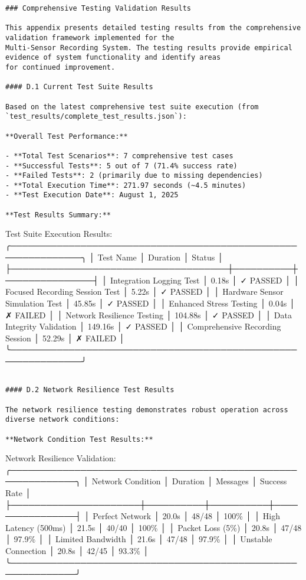 \documentclass[12pt,a4paper]{report}
\begin{document}
{{\begin{verbatim}
### Comprehensive Testing Validation Results

This appendix presents detailed testing results from the comprehensive validation framework implemented for the
Multi-Sensor Recording System. The testing results provide empirical evidence of system functionality and identify areas
for continued improvement.

#### D.1 Current Test Suite Results

Based on the latest comprehensive test suite execution (from `test_results/complete_test_results.json`):

**Overall Test Performance:**

- **Total Test Scenarios**: 7 comprehensive test cases
- **Successful Tests**: 5 out of 7 (71.4% success rate)
- **Failed Tests**: 2 (primarily due to missing dependencies)
- **Total Execution Time**: 271.97 seconds (~4.5 minutes)
- **Test Execution Date**: August 1, 2025

**Test Results Summary:**

\end{verbatim}
Test Suite Execution Results:
╭──────────────────────────────────────────────────────────────╮
│ Test Name                           │ Duration │ Status        │
├─────────────────────────────────────┼──────────┼───────────────┤
│ Integration Logging Test            │ 0.18s    │ ✓ PASSED     │
│ Focused Recording Session Test      │ 5.22s    │ ✓ PASSED     │
│ Hardware Sensor Simulation Test    │ 45.85s   │ ✓ PASSED     │
│ Enhanced Stress Testing             │ 0.04s    │ ✗ FAILED     │
│ Network Resilience Testing          │ 104.88s  │ ✓ PASSED     │
│ Data Integrity Validation          │ 149.16s  │ ✓ PASSED     │
│ Comprehensive Recording Session     │ 52.29s   │ ✗ FAILED     │
╰──────────────────────────────────────────────────────────────╯
\begin{verbatim}

#### D.2 Network Resilience Test Results

The network resilience testing demonstrates robust operation across diverse network conditions:

**Network Condition Test Results:**

\end{verbatim}
Network Resilience Validation:
╭─────────────────────────────────────────────────────────────╮
│ Network Condition    │ Duration │ Messages │ Success Rate   │
├──────────────────────┼──────────┼──────────┼────────────────┤
│ Perfect Network      │ 20.0s    │ 48/48    │ 100\%          │
│ High Latency (500ms) │ 21.5s    │ 40/40    │ 100\%          │
│ Packet Loss (5\%)     │ 20.8s    │ 47/48    │ 97.9\%         │
│ Limited Bandwidth    │ 21.6s    │ 47/48    │ 97.9\%         │
│ Unstable Connection  │ 20.8s    │ 42/45    │ 93.3\%         │
╰─────────────────────────────────────────────────────────────╯
\begin{verbatim}


\end{verbatim}}}
\end{document}
